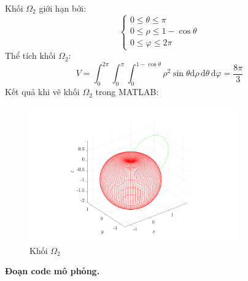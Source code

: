 \documentclass[12pt,a4paper]{article}
\begin{document}
Khối $\Omega_2$ giới hạn bởi:
\[
    \begin{cases}
        0 \leq \theta \leq \pi \\
        0 \leq \rho \leq 1 - \cos \theta \\
        0 \leq \varphi \leq 2\pi
    \end{cases}    
\]
Thể tích khối $\Omega_2$:
\[
    V = \int_{0}^{2\pi} \int_{0}^{\pi} \int_{0}^{1-\cos \theta}\rho^2 \sin \theta \mathrm{d}\rho \,\mathrm{d} \theta \, \mathrm{d}\varphi = \frac{8\pi}{3}    
\]
\newpage
Kết quả khi vẽ khối $\Omega_2$ trong MATLAB:
\begin{figure}[h!]
    \centering
    \includegraphics[width = 0.8\textwidth]{figure3.png}
    \caption{Khối $\Omega_2$}
\end{figure}

\textbf{Đoạn code mô phỏng.}

\end{document}

